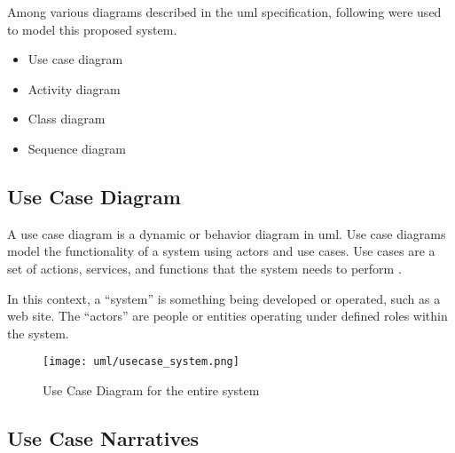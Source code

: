 \documentclass[12pt]{report}
\begin{document}
Among various diagrams described in the \acrshort{uml} specification, following were used to model this proposed system.

\begin{itemize}
	\item Use case diagram
	\item Activity diagram
	\item Class diagram
	\item Sequence diagram
\end{itemize}

\newpage
\subsection{Use Case Diagram}
A use case diagram is a dynamic or behavior diagram in \acrshort{uml}. Use case diagrams model the functionality of a system using actors and use cases. Use cases are a set of actions, services, and functions that the system needs to perform \cite{paradigm_2018_uml}.

In this context, a ``system'' is something being developed or operated, such as a web site. The ``actors'' are people or entities operating under defined roles within the system.

\begin{figure}[H]
	\centering
	\texttt{[image: uml/usecase\_system.png]}
	\caption{Use Case Diagram for the entire system}
\end{figure}

\newpage
\subsection{Use Case Narratives}
\end{document}

